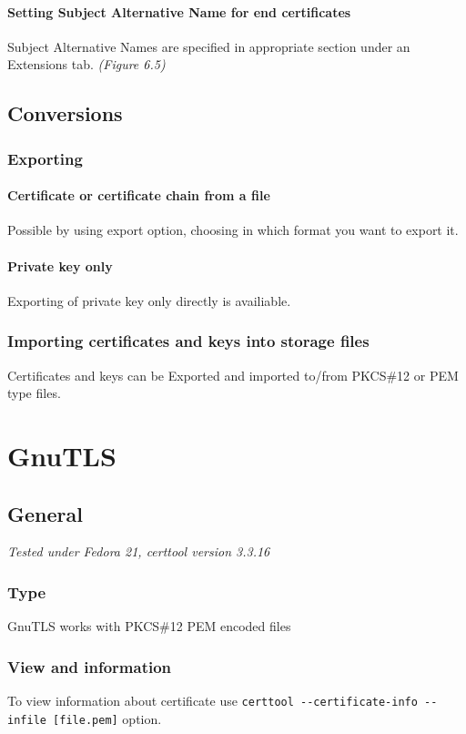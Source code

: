 \documentclass[10pt, a4paper]{report}
\begin{document}
    \subsubsection{Setting Subject Alternative Name for end certificates}
Subject Alternative Names are specified in appropriate section under an Extensions tab.
\textit{(Figure 6.5)}

\section{Conversions}

  \subsection{Exporting}
  
    \subsubsection{Certificate or certificate chain from a file}
Possible by using export option, choosing in which format you want to export it.

    \subsubsection{Private key only}
Exporting of private key only directly is availiable.

  \subsection{Importing certificates and keys into storage files}
Certificates and keys can be Exported and imported to/from PKCS\#12 or PEM type files.

\chapter{GnuTLS}

\section{General}

\textit{Tested under Fedora 21, certtool version 3.3.16}

  \subsection{Type}
GnuTLS works with PKCS\#12 PEM encoded files
  \subsection{View and information}
To view information about certificate use \verb+certtool --certificate-info --infile [file.pem]+ option.
\end{document}

